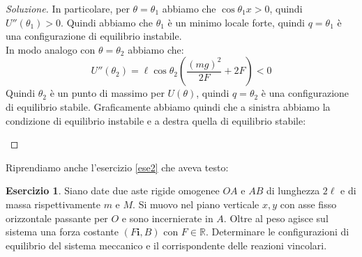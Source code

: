 \documentclass[11pt,a4paper,twoside]{article}
\theoremstyle{definition}
\newtheorem{ese}{Esercizio}[section]
\newenvironment{sol}
	{\renewcommand\qedsymbol{$\blacksquare$}\begin{proof}[Soluzione]}
	{\end{proof}}
\begin{document}
\begin{sol}
	In particolare, per $\theta = \theta_1$ abbiamo che $\cos \theta_1x>0$, quindi $U''(\theta_1)>0$. Quindi abbiamo che $\theta_1$ è un minimo locale forte, quindi $q = \theta_1$ è una configurazione di equilibrio instabile.\\
	In modo analogo con $\theta = \theta_2$ abbiamo che:
	\[ U''(\theta_2) = \ell \cos \theta_2 \left( \frac{(mg)^2}{2F} + 2F \right) <0 \]
	Quindi $\theta_2$ è un punto di massimo per $U(\theta)$, quindi $q= \theta_2$ è una configurazione di equilibrio stabile.
	Graficamente abbiamo quindi che a sinistra abbiamo la condizione di equilibrio instabile e a destra quella di equilibrio stabile:
	\begin{center}
		 \qquad
	\end{center}
\end{sol}

Riprendiamo anche l'esercizio \ref{ese2} che aveva testo:

\begin{ese}
	Siano date due aste rigide omogenee $OA$ e $AB$ di lunghezza $2\ell$ e di massa rispettivamente $m$ e $M$. Si muovo nel piano verticale $x,y$ con asse fisso orizzontale passante per $O$ e sono incernierate in $A$. Oltre al peso agisce sul sistema una forza costante $(F \mathbf i, B)$ con $F \in \mathbb R$. Determinare le configurazioni di equilibrio del sistema meccanico e il corrispondente delle reazioni vincolari.
\end{ese}
\end{document}
